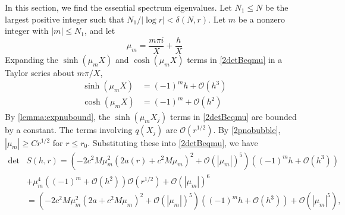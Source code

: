 \documentclass[thesis.tex]{subfiles}
\begin{document}
In this section, we find the essential spectrum eigenvalues. Let $N_1 \leq N$ be the largest positive integer such that $N_1/|\log r| < \delta(N,r)$. Let $m$ be a nonzero integer with $|m| \leq N_1$, and let
\begin{equation}\label{defmum}
\mu_m = \frac{m \pi i}{X} + \frac{h}{X}
\end{equation}
Expanding the $\sinh(\mu_m X)$ and $\cosh(\mu_m X)$ terms in \cref{2detBeqmu} in a Taylor series about $m \pi/X$,
\begin{align*}
\sinh(\mu_m X) &= (-1)^m h + \mathcal{O}(h^3) \\
\cosh(\mu_m X) &= (-1)^m + \mathcal{O}(h^2)
\end{align*}
By \cref{lemma:expnubound}, the $\sinh(\mu_m X_j)$ terms in \cref{2detBeqmu} are bounded by a constant. The terms involving $q(X_j)$ are $\mathcal{O}(r^{1/2})$. By \cref{2pnobubble}, $|\mu_m| \geq C r^{1/2}$ for $r \leq r_0$. Substituting these into \cref{2detBeqmu}, we have 
\begin{equation}\label{Bess1}
\begin{aligned}
\det &S(h, r) = \left(-2 c^2 M  \mu_m^2 \left( 2a(r) + c^2 M \mu_m \right)^2 + \mathcal{O}( |\mu_m|)^5 \right) \left( (-1)^m h + \mathcal{O}(h^3) \right) \\
&+ \mu_m^4 \left( (-1)^m + \mathcal{O}(h^2)\right)\mathcal{O}(r^{1/2}) + \mathcal{O}\left( |\mu_m| \right)^6 \\
&= \left(-2 c^2 M  \mu_m^2 \left( 2a + c^2 M \mu_m \right)^2 + \mathcal{O}( |\mu_m|)^5 \right) \left( (-1)^m h + \mathcal{O}(h^3) \right) + \mathcal{O}\left( |\mu_m|^5 \right),
\end{aligned}
\end{equation}
\end{document}
